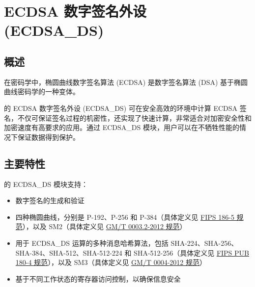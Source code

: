 \documentclass[main\_\_CN.tex]{subfiles}
\begin{document}
\setchineseformatting


\ifglobal
\else
    \clearpage
    \listoftodos
    \listofdonetodos
    \tableofcontents
\fi



\hypertarget{ecdsa}{}
\chapter{ECDSA 数字签名外设 (ECDSA\_DS)}
\label{mod:ecdsa}



\section{概述}

在密码学中，椭圆曲线数字签名算法 (ECDSA) 是数字签名算法 (DSA) 基于椭圆曲线密码学的一种变体。

\chipname{} 的 ECDSA 数字签名外设 (ECDSA\_DS) 可在安全高效的环境中计算 ECDSA 签名，不仅可保证签名过程的机密性，还实现了快速计算，非常适合对加密安全性和加密速度有高要求的应用。通过 ECDSA\_DS 模块，用户可以在不牺牲性能的情况下保证数据得到保护。



\section{主要特性}
\label{sec:ecdsa-features}

\chipname{} 的 ECDSA\_DS 模块支持：

\begin{itemize}
    \item 数字签名的生成和验证
    \item 四种椭圆曲线，分别是 P-192、P-256 和 P-384（具体定义见 \href{https://nvlpubs.nist.gov/nistpubs/FIPS/NIST.FIPS.186-5.pdf}{FIPS 186-5 规范}），以及 SM2（具体定义见 \href{http://www.gmbz.org.cn/file/2018-01-08/f60d13a3-e0fd-40d8-a80f-13fde691ef03.pdf}{GM/T 0003.2-2012 规范}）
    \item 用于 ECDSA\_DS 运算的多种消息哈希算法，包括 SHA-224、SHA-256、SHA-384、SHA-512、SHA-512-224 和 SHA-512-256（具体定义见 \href{https://doi.org/10.6028/NIST.FIPS.180-4}{FIPS PUB 180-4 规范}），以及 SM3（具体定义见 \href{http://www.gmbz.org.cn/file/2018-01-08/6db059ec-61e1-4ff9-b112-ae15471ad6b5.PDF}{GM/T 0004-2012 规范}）
    \item 基于不同工作状态的寄存器访问控制，以确保信息安全
\end{itemize}
\end{document}
